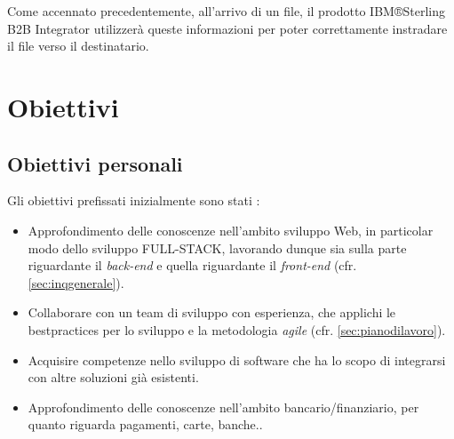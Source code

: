 Come accennato precedentemente, all'arrivo di un file, il prodotto  IBM®Sterling B2B Integrator utilizzerà queste informazioni per poter correttamente instradare il file verso il destinatario.











\section{Obiettivi}
\label{sec:obiettivi}


\subsection{Obiettivi personali}
\label{subsec:obiettivipersonali}

Gli obiettivi prefissati inizialmente sono stati :

\begin{itemize}
    \item Approfondimento delle conoscenze nell'ambito sviluppo Web, in particolar modo 
    dello sviluppo \gls{FULL-STACK}, lavorando dunque sia sulla parte riguardante il \textit{back-end} e quella riguardante il \textit{front-end} (cfr. \ref{sec:inqgenerale}).
    
    \item Collaborare con un team di sviluppo con esperienza, che applichi le \gls{bestpractices} per lo sviluppo e la metodologia \textit{agile} (cfr. \ref{sec:pianodilavoro}).
    
    \item Acquisire competenze nello sviluppo di software che ha lo scopo di integrarsi con altre soluzioni già esistenti.
    
    \item Approfondimento delle conoscenze nell'ambito bancario/finanziario, per quanto riguarda pagamenti, carte, banche..
\end{itemize}

